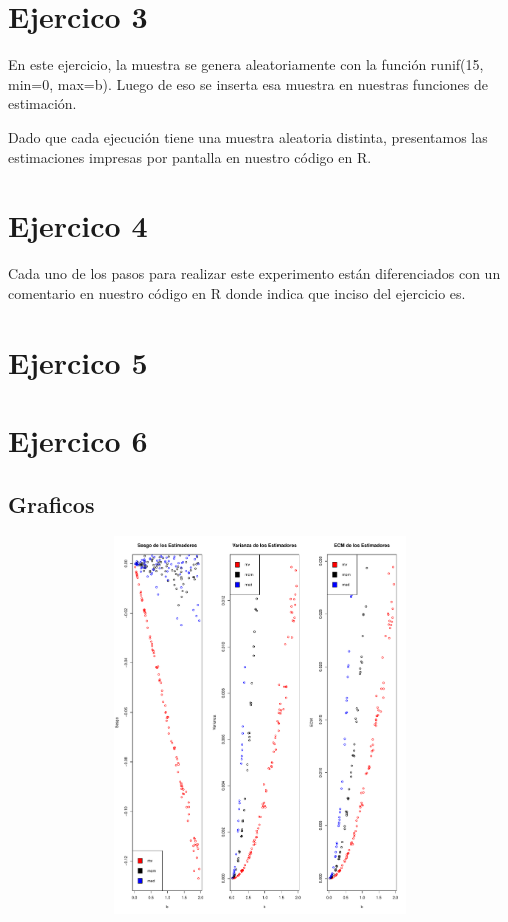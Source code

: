 \documentclass[a4paper]{article}
\begin{document}
\section{Ejercico 3}
En este ejercicio, la muestra se genera aleatoriamente con la función runif(15, min=0, max=b). Luego de eso se inserta esa muestra en nuestras funciones de estimación. 

Dado que cada ejecución tiene una muestra aleatoria distinta, presentamos las estimaciones impresas por pantalla en nuestro código en R.

\section{Ejercico 4}
Cada uno de los pasos para realizar este experimento están diferenciados con un comentario en nuestro código en R donde indica que inciso del ejercicio es.


\section{Ejercico 5}

\section{Ejercico 6}
\subsection{Graficos}
\begin{figure}[H]
	\centering
	\includegraphics[width=15cm, height=10cm]{Ejercicio-6-plot}
\end{figure}
\end{document}
